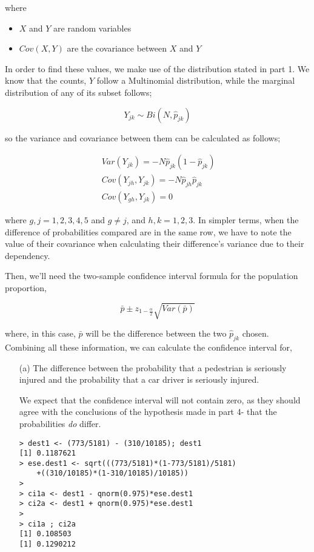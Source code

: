 \documentclass[11pt,a4]{article}
\begin{document}
\begin{enumerate}
where 
\begin{itemize}
    \item $X$ and $Y$ are random variables
    \item $Cov(X,Y)$ are the covariance between $X$ and $Y$
\end{itemize}

In order to find these values, we make use of the distribution stated in part 1. We know that the counts, $Y$ follow a Multinomial distribution, while the marginal distribution of any of its subset follows;

\[ Y_{jk} \sim Bi(N, \hat{p}_{jk}) \]

so the variance and covariance between them can be calculated as follows;

\begin{align}
\ Var(Y_{jk}) = -N\hat{p}_{jk}(1-\hat{p}_{jk})\\
\ Cov(Y_{jh},Y_{jk}) = -N\hat{p}_{jh}\hat{p}_{jk} \\
\ Cov(Y_{gh},Y_{jk}) = 0
\end{align}

where $g, j = 1,2,3,4,5$ and $g \neq j$, and $h, k = 1,2,3$. In simpler terms, when the difference of probabilities compared are in the same row, we have to note the value of their covariance when calculating their difference's variance due to their dependency.

Then, we'll need the two-sample confidence interval formula for the population proportion,

\[\bar{p} \pm z_{1-\frac{\alpha}{2}}\sqrt{Var(\bar{p})} \]

where, in this case, $\bar{p}$ will be the difference between the two $\hat{p}_{jk}$ chosen. Combining all these information, we can calculate the confidence interval for,

\begin{itemize}
\item [(a)]
The difference between the probability that a pedestrian is seriously injured and the probability that a car driver is seriously injured.

\bigskip

We expect that the confidence interval will not contain zero, as they should agree with the conclusions of the hypothesis made in part 4- that the probabilities \emph{do} differ.
  
\begin{verbatim}
> dest1 <- (773/5181) - (310/10185); dest1
[1] 0.1187621
> ese.dest1 <- sqrt(((773/5181)*(1-773/5181)/5181)
    +((310/10185)*(1-310/10185)/10185))
> 
> ci1a <- dest1 - qnorm(0.975)*ese.dest1
> ci2a <- dest1 + qnorm(0.975)*ese.dest1
> 
> ci1a ; ci2a
[1] 0.108503
[1] 0.1290212
\end{verbatim}	


\end{itemize}
\end{enumerate}
\end{document}
